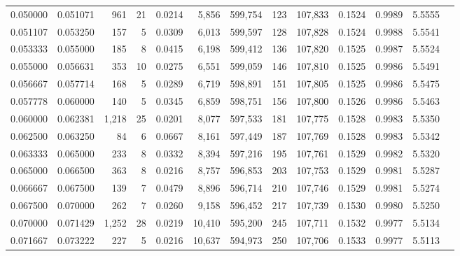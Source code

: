 \begin{tabular}{rrrrrrrrrrrrr}
0.050000 & 0.051071 &   961 &  21 &                                     0.0214 &   5,856 & 599,754 &     123 & 107,833 & 0.1524 & 0.9989 & 5.5555 \\
0.051107 & 0.053250 &   157 &   5 &                                     0.0309 &   6,013 & 599,597 &     128 & 107,828 & 0.1524 & 0.9988 & 5.5541 \\
0.053333 & 0.055000 &   185 &   8 &                                     0.0415 &   6,198 & 599,412 &     136 & 107,820 & 0.1525 & 0.9987 & 5.5524 \\
0.055000 & 0.056631 &   353 &  10 &                                     0.0275 &   6,551 & 599,059 &     146 & 107,810 & 0.1525 & 0.9986 & 5.5491 \\
0.056667 & 0.057714 &   168 &   5 &                                     0.0289 &   6,719 & 598,891 &     151 & 107,805 & 0.1525 & 0.9986 & 5.5475 \\
0.057778 & 0.060000 &   140 &   5 &                                     0.0345 &   6,859 & 598,751 &     156 & 107,800 & 0.1526 & 0.9986 & 5.5463 \\
0.060000 & 0.062381 & 1,218 &  25 &                                     0.0201 &   8,077 & 597,533 &     181 & 107,775 & 0.1528 & 0.9983 & 5.5350 \\
0.062500 & 0.063250 &    84 &   6 &                                     0.0667 &   8,161 & 597,449 &     187 & 107,769 & 0.1528 & 0.9983 & 5.5342 \\
0.063333 & 0.065000 &   233 &   8 &                                     0.0332 &   8,394 & 597,216 &     195 & 107,761 & 0.1529 & 0.9982 & 5.5320 \\
0.065000 & 0.066500 &   363 &   8 &                                     0.0216 &   8,757 & 596,853 &     203 & 107,753 & 0.1529 & 0.9981 & 5.5287 \\
0.066667 & 0.067500 &   139 &   7 &                                     0.0479 &   8,896 & 596,714 &     210 & 107,746 & 0.1529 & 0.9981 & 5.5274 \\
0.067500 & 0.070000 &   262 &   7 &                                     0.0260 &   9,158 & 596,452 &     217 & 107,739 & 0.1530 & 0.9980 & 5.5250 \\
0.070000 & 0.071429 & 1,252 &  28 &                                     0.0219 &  10,410 & 595,200 &     245 & 107,711 & 0.1532 & 0.9977 & 5.5134 \\
0.071667 & 0.073222 &   227 &   5 &                                     0.0216 &  10,637 & 594,973 &     250 & 107,706 & 0.1533 & 0.9977 & 5.5113 \\

\end{tabular}
